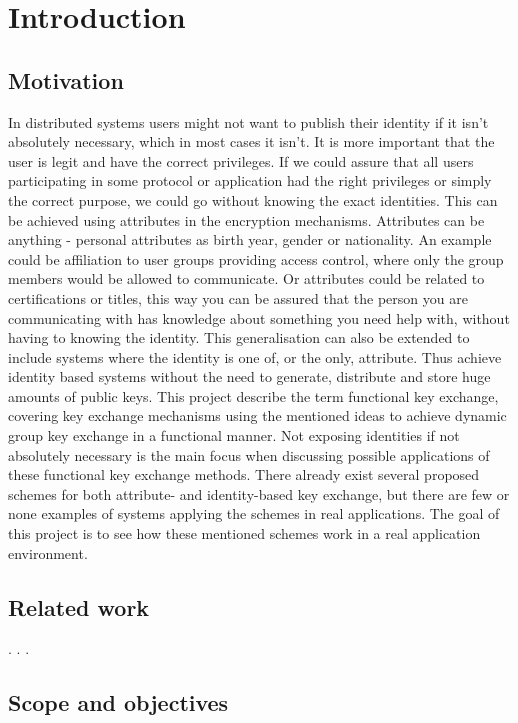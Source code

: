 \chapter{Introduction}
\label{chp:intro} 
\section{Motivation}
In distributed systems users might not want to publish their identity if it isn't absolutely necessary, which in most cases it isn't. It is more important that the user is legit and have the correct privileges. If we could assure that all users participating in some protocol or application had the right privileges or simply the correct purpose, we could go without knowing the exact identities. This can be achieved using attributes in the encryption mechanisms. Attributes can be anything - personal attributes as birth year, gender or nationality. An example could be affiliation to user groups providing access control, where only the group members would be allowed to communicate. Or attributes could be related to certifications or titles, this way you can be assured that the person you are communicating with has knowledge about something you need help with, without having to knowing the identity. This generalisation can also be extended to include systems where the identity is one of, or the only, attribute. Thus achieve identity based systems without the need to generate, distribute and store huge amounts of public keys. This project describe the term functional key exchange, covering key exchange mechanisms using the mentioned ideas to achieve dynamic group key exchange in a functional manner. Not exposing identities if not absolutely necessary is the main focus when discussing possible applications of these functional key exchange methods. There already exist several proposed schemes for both attribute- and identity-based key exchange, but there are few or none examples of systems applying the schemes in real applications. The goal of this project is to see how these mentioned schemes work in a real application environment.

\section{Related work}\label{sec:related_work}
\cite{abe_waters09}. \cite{gorantla2010attribute}. \cite{ibe_waters09}. 

\section{Scope and objectives}\label{sec:scope}


